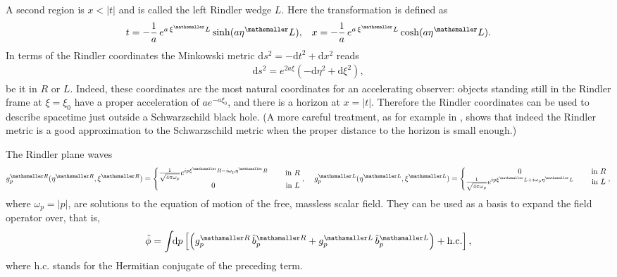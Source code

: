 \documentclass[11pt, a4paper]{article}
\newcommand{\om}{\omega}
\newcommand{\sfrac}[2]{{\textstyle\frac{#1}{#2}}}
\newcommand{\integral}{\int\!\! \mathrm{d}}
\newcommand{\ms}{\mathsmaller}
\newcommand{\mrm}{\mathrm}
\begin{document}
A second region is $x<|t|$ and is called the left Rindler wedge $L$. Here the transformation is defined as
\begin{align*}
t=-\frac{1}{a}\,e^{a\,\xi^\mathsmaller L}\sinh(a\eta^\mathsmaller L),&&x=-\frac{1}{a}\,e^{a\,\xi^\mathsmaller L}\cosh(a\eta^\mathsmaller L).
\end{align*}
In terms of the Rindler coordinates the Minkowski metric $\mathrm d s^2=-\mathrm d t^2 + \mathrm d x^2$ reads
\begin{align}
\label{eq:RindlerMetirc}
	\mrm ds^2=e^{2a\xi}(-\mrm d\eta^2+\mrm d\xi^2),
\end{align}
be it in $R$ or $L$. Indeed, these coordinates are the most natural coordinates for an accelerating observer: objects standing still in the Rindler frame at $\xi=\xi_0$ have a proper acceleration of $a e^{-a\xi_0}$, and there is a horizon at $x=|t|$. Therefore the Rindler coordinates can be used to describe spacetime just outside a Schwarzschild black hole. (A more careful treatment, as for example in \cite{Susskind}, shows that indeed the Rindler metric is a good approximation to the Schwarzschild metric when the proper distance to the horizon is small enough.)

The Rindler plane waves 
\begin{align}
\label{eq:RindlerPlaneWaves}g^{\ms R}_p(\eta^{\ms R},\xi^{\ms R})=\left\{
\begin{matrix}
	\sfrac{1}{\sqrt{4\pi \om_p}}e^{i p\xi^\mathsmaller R-i \om_p \eta^\mathsmaller R}&\  &\text{in }R\\
	0&\ &\text{in } L\\
\end{matrix}
\right.,
&\ &
g^{\ms L}_p(\eta^{\ms L},\xi^{\ms L})=\left\{
\begin{matrix}
	0&\  &\text{in }R\\
	\sfrac{1}{\sqrt{4\pi \om_p}}e^{ip\xi^\mathsmaller L+i\om_p\eta^\mathsmaller L}&\ &\text{in } L\\
\end{matrix}
\right.,\end{align}
where $\om_p=|p|$,
are solutions to the equation of motion of the free, massless scalar field. They can be used as a basis to expand the field operator over, that is,  
\begin{align*}
\hat \phi =\integral p \left[\left(g^{\ms R}_p\,\hat b^{\ms R}_p+g^{\ms L}_p\,\hat b^{\ms L}_p\right)+\mathrm{h.c.}\right],
\end{align*}
where h.c. stands for the Hermitian conjugate of the preceding term.
\end{document}
